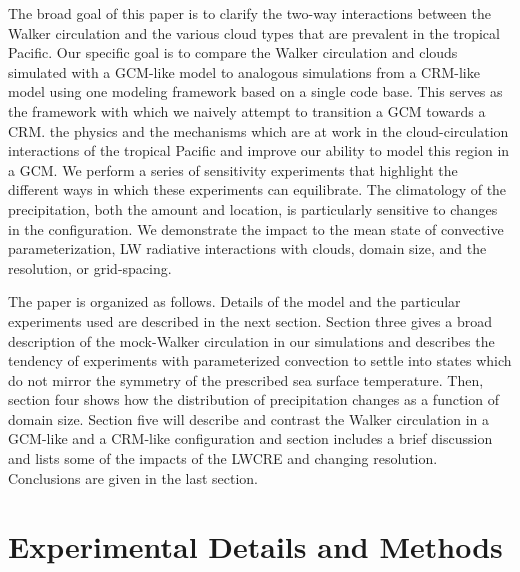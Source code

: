 \documentclass[draft]{agujournal2019}
\begin{document}
The broad goal of this paper is to clarify the two-way interactions between the Walker circulation and 
the various cloud types that are prevalent in the tropical Pacific.   Our specific goal is
to compare the Walker circulation and clouds simulated with a GCM-like model to analogous 
simulations from a CRM-like model using one modeling framework based on a single code base. 
This serves as the framework with which we naively attempt to transition a GCM 
towards a CRM.  
the physics and the mechanisms which are at work in the cloud-circulation
interactions of the tropical Pacific and improve our ability to model this region in a GCM.
We perform a series of sensitivity experiments that highlight the different ways in which these experiments can equilibrate.  
The climatology of the precipitation, both the amount and location, is particularly sensitive to changes in the configuration.   
We demonstrate the impact to the mean state of convective parameterization, LW radiative interactions with clouds, domain size, 
and the resolution, or grid-spacing.

The paper is organized as follows.  Details of the model and the particular experiments used are described
in the next section. Section three gives a broad description of the mock-Walker circulation in our simulations and
describes the tendency of experiments with parameterized convection 
to settle into states which do not mirror the symmetry of the prescribed sea surface temperature.   
Then, section four shows how the distribution of precipitation changes as a function of domain size.  
Section five will describe and contrast the Walker circulation in a GCM-like and a CRM-like configuration and
section  includes a brief discussion and lists some of the impacts of the LWCRE and changing 
resolution.  Conclusions are given in the last section.   

\section{Experimental Details and Methods}
\end{document}
